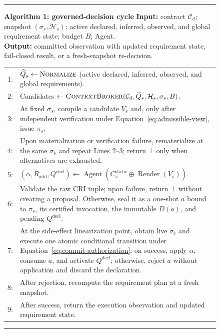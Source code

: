 \begin{figure}[tb]
\begin{center}
\begin{minipage}{0.9\columnwidth}
\hrule
\noindent\textbf{Algorithm 1: \method{} governed-decision cycle}
\footnotesize
\noindent\textbf{Input:} contract $\mathcal C_d$; snapshot
$(\sigma_s,\mathcal H_s)$; active declared, inferred, observed, and global
requirement state; budget $B$; Agent.\\
\noindent\textbf{Output:} committed observation with updated requirement
state, fail-closed result, or a fresh-snapshot re-decision.
\begin{tabularx}{\linewidth}{@{}r@{\hspace{0.45em}}X@{}}
1: & $\widehat Q_s\leftarrow\textsc{Normalize}$ (active declared, inferred,
     observed, and global requirements). \\
2: & Candidates $\leftarrow\textsc{ContextBroker}
     (\mathcal C_d,\widehat Q_s,\mathcal H_s,\sigma_s,B)$. \\
3: & At fixed $\sigma_s$, compile a candidate $V_s$ and, only after independent
     verification under Equation~\eqref{eq:admissible-view}, issue $\pi_s$. \\
4: & Upon materialization or verification failure, rematerialize at the same
     $\sigma_s$ and repeat Lines 2--3; return $\bot$ only when alternatives
     are exhausted. \\
5: & $(\alpha,R_{\mathrm{add}},Q^{\mathrm{decl}})\leftarrow
     \operatorname{Agent}(C_s^{\mathrm{static}}\oplus\operatorname{Render}(V_s))$. \\
6: & Validate the raw CRI tuple; upon failure, return $\bot$ without creating a
     proposal. Otherwise, seal it as a one-shot $a$ bound to $\pi_s$, its certified
     invocation, the immutable $D(a)$, and pending $Q^{\mathrm{decl}}$. \\
7: & At the side-effect linearization point, obtain live $\sigma_e$ and execute one
     atomic conditional transition under Equation~\eqref{eq:commit-authorization}:
     on success, apply $\alpha$, consume $a$, and activate $Q^{\mathrm{decl}}$;
     otherwise, reject $a$ without application and discard the declaration. \\
8: & After rejection, recompute the requirement plan at a fresh snapshot. \\
9: & After success, return the execution observation and updated requirement state. \\
\end{tabularx}
\hrule
\end{minipage}
\end{center}
\end{figure}
